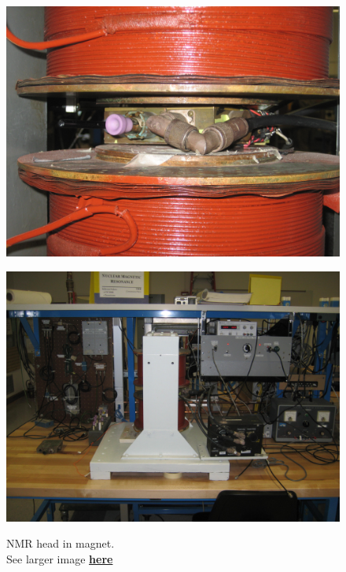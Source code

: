 \documentclass{../lab}
\begin{document}
\begin{figure}[H]
\begin{minipage}{0.36\textwidth}
    \href{http://experimentationlab.berkeley.edu/sites/default/files/images/NMR_Head-in-Magnet_3560.jpg}{\includegraphics[width=\linewidth,keepaspectratio]{images/NMR_Head-in-Magnet_3560.jpg}}
    \caption{NMR head in magnet. \\See larger image \href{http://experimentationlab.berkeley.edu/sites/default/files/images/NMR_Head-in-Magnet_3560.jpg}{\textbf{here}}}
\end{minipage}
\begin{minipage}{0.36\textwidth}
    \href{http://experimentationlab.berkeley.edu/sites/default/files/images/PNMR_3494.jpg}{\includegraphics[width=\linewidth,keepaspectratio]{images/PNMR_3494.jpg}}

\end{minipage}
\end{figure}
\end{document}
